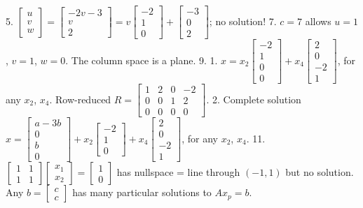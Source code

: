 5. \(\begin{bmatrix}u\\ v\\ w\end{bmatrix}=\begin{bmatrix}-2v-3\\ v\\ 2\end{bmatrix}=v\begin{bmatrix}-2\\ 1\\ 0\end{bmatrix}+\begin{bmatrix}-3\\ 0\\ 2\end{bmatrix}\); no solution!
7. \(c=7\) allows \(u=1\), \(v=1\), \(w=0\). The column space is a plane.
9. 1. \(x=x_{2}\begin{bmatrix}-2\\ 1\\ 0\\ 0\end{bmatrix}+x_{4}\begin{bmatrix}2\\ 0\\ -2\\ 1\end{bmatrix}\), for any \(x_{2}\), \(x_{4}\). Row-reduced \(R=\begin{bmatrix}1&2&0&-2\\ 0&0&1&2\\ 0&0&0&0\end{bmatrix}\). 2. Complete solution \(x=\begin{bmatrix}a-3b\\ 0\\ b\\ 0\end{bmatrix}+x_{2}\begin{bmatrix}-2\\ 1\\ 0\end{bmatrix}+x_{4}\begin{bmatrix}2\\ 0\\ -2\\ 1\end{bmatrix}\), for any \(x_{2}\), \(x_{4}\).
11. \(\begin{bmatrix}1&1\\ 1&1\end{bmatrix}\begin{bmatrix}x_{1}\\ x_{2}\end{bmatrix}=\begin{bmatrix}1\\ 0\end{bmatrix}\) has nullspace = line through \((-1,1)\) but no solution. Any \(b=\begin{bmatrix}c\\ c\end{bmatrix}\) has many particular solutions to \(Ax_{p}=b\).
